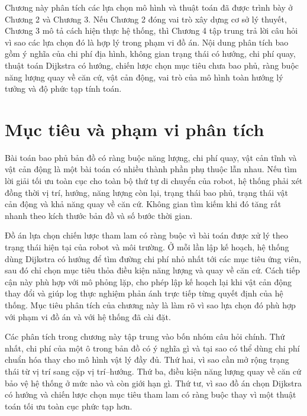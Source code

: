 \documentclass[../DoAn.tex]{subfiles}
\begin{document}
\renewcommand{\tablename}{Bảng}

Chương này phân tích các lựa chọn mô hình và thuật toán đã được trình bày ở Chương 2 và Chương 3. Nếu Chương 2 đóng vai trò xây dựng cơ sở lý thuyết, Chương 3 mô tả cách hiện thực hệ thống, thì Chương 4 tập trung trả lời câu hỏi vì sao các lựa chọn đó là hợp lý trong phạm vi đồ án. Nội dung phân tích bao gồm ý nghĩa của chi phí địa hình, không gian trạng thái có hướng, chi phí quay, thuật toán Dijkstra có hướng, chiến lược chọn mục tiêu chưa bao phủ, ràng buộc năng lượng quay về căn cứ, vật cản động, vai trò của mô hình toàn hướng lý tưởng và độ phức tạp tính toán.

\section{Mục tiêu và phạm vi phân tích}

Bài toán bao phủ bản đồ có ràng buộc năng lượng, chi phí quay, vật cản tĩnh và vật cản động là một bài toán có nhiều thành phần phụ thuộc lẫn nhau. Nếu tìm lời giải tối ưu toàn cục cho toàn bộ thứ tự di chuyển của robot, hệ thống phải xét đồng thời vị trí, hướng, năng lượng còn lại, trạng thái bao phủ, trạng thái vật cản động và khả năng quay về căn cứ. Không gian tìm kiếm khi đó tăng rất nhanh theo kích thước bản đồ và số bước thời gian.

Đồ án lựa chọn chiến lược tham lam có ràng buộc vì bài toán được xử lý theo trạng thái hiện tại của robot và môi trường. Ở mỗi lần lập kế hoạch, hệ thống dùng Dijkstra có hướng để tìm đường chi phí nhỏ nhất tới các mục tiêu ứng viên, sau đó chỉ chọn mục tiêu thỏa điều kiện năng lượng và quay về căn cứ. Cách tiếp cận này phù hợp với mô phỏng lặp, cho phép lập kế hoạch lại khi vật cản động thay đổi và giúp log thực nghiệm phản ánh trực tiếp từng quyết định của hệ thống. Mục tiêu phân tích của chương này là làm rõ vì sao lựa chọn đó phù hợp với phạm vi đồ án và với hệ thống đã cài đặt.

Các phân tích trong chương này tập trung vào bốn nhóm câu hỏi chính. Thứ nhất, chi phí của một ô trong bản đồ có ý nghĩa gì và tại sao có thể dùng chi phí chuẩn hóa thay cho mô hình vật lý đầy đủ. Thứ hai, vì sao cần mở rộng trạng thái từ vị trí sang cặp vị trí--hướng. Thứ ba, điều kiện năng lượng quay về căn cứ bảo vệ hệ thống ở mức nào và còn giới hạn gì. Thứ tư, vì sao đồ án chọn Dijkstra có hướng và chiến lược chọn mục tiêu tham lam có ràng buộc thay vì một thuật toán tối ưu toàn cục phức tạp hơn.
\end{document}
